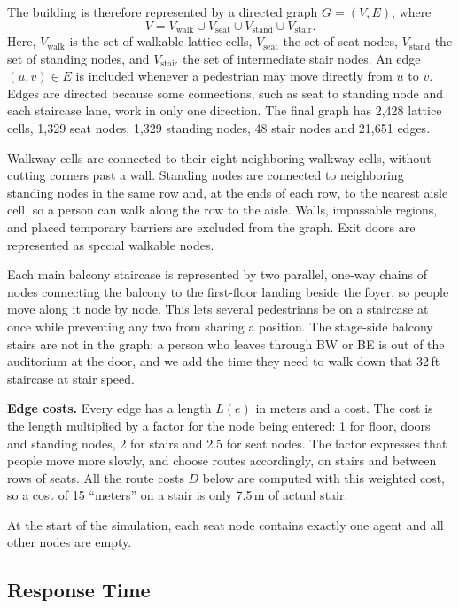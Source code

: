 \documentclass{article}
\begin{document}
The building is therefore represented by a directed graph $G=(V,E)$, where
\[
V = V_{\text{walk}} \cup V_{\text{seat}} \cup V_{\text{stand}} \cup V_{\text{stair}}.
\]
Here, $V_{\text{walk}}$ is the set of walkable lattice cells, $V_{\text{seat}}$ the set of seat nodes, $V_{\text{stand}}$ the set of standing nodes, and $V_{\text{stair}}$ the set of intermediate stair nodes. An edge $(u,v)\in E$ is included whenever a pedestrian may move directly from $u$ to $v$. Edges are directed because some connections, such as seat to standing node and each staircase lane, work in only one direction. The final graph has 2,428 lattice cells, 1,329 seat nodes, 1,329 standing nodes, 48 stair nodes and 21,651 edges.

Walkway cells are connected to their eight neighboring walkway cells, without cutting corners past a wall. Standing nodes are connected to neighboring standing nodes in the same row and, at the ends of each row, to the nearest aisle cell, so a person can walk along the row to the aisle. Walls, impassable regions, and placed temporary barriers are excluded from the graph. Exit doors are represented as special walkable nodes.

Each main balcony staircase is represented by two parallel, one-way chains of nodes connecting the balcony to the first-floor landing beside the foyer, so people move along it node by node. This lets several pedestrians be on a staircase at once while preventing any two from sharing a position. The stage-side balcony stairs are not in the graph; a person who leaves through BW or BE is out of the auditorium at the door, and we add the time they need to walk down that 32\,ft staircase at stair speed.

\textbf{Edge costs.} Every edge has a length $L(e)$ in meters and a cost. The cost is the length multiplied by a factor for the node being entered: 1 for floor, doors and standing nodes, 2 for stairs and 2.5 for seat nodes. The factor expresses that people move more slowly, and choose routes accordingly, on stairs and between rows of seats. All the route costs $D$ below are computed with this weighted cost, so a cost of 15 ``meters'' on a stair is only 7.5\,m of actual stair.

At the start of the simulation, each seat node contains exactly one agent and all other nodes are empty.


\subsection{Response Time}
\label{sec:response}
\end{document}
